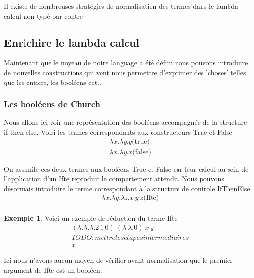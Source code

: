 \documentclass {article}
\theoremstyle{definition}
\newtheorem{example}{Exemple}
\theoremstyle{remark}
\begin{document}
Il existe de nombreuses stratégies de normalisation des termes dans le lambda 
calcul non typé %
par contre



\subsection{Enrichire le lambda calcul}

Maintenant que le noyeau de notre language a été défini nous pouvons introduire
de nouvelles constructions qui vont nous permettre d'exprimer des 'choses' %
telles que les entiers, les booléens ect...

\subsubsection{Les booléens de Church}

Nous allons ici voir une représentation des booléens accompagnée de la 
structure if then else.
Voici les termes correspondants aux constructeurs True et False
\begin{align*}
  &\lambda x.\lambda y. y \mbox{(true)} \\
  &\lambda x.\lambda y. x \mbox{(false)} 
\end{align*}

On assimile ces deux termes aux booléens True et False car leur calcul au sein
de l'application d'un Ifte reproduit le comportement attendu.
Nous pouvons désormais introduire le terme correspondant à la structure de 
controle IfThenElse 
\begin{align*}
  &\lambda x.\lambda y.\lambda z. x\: y\: z \mbox{(Ifte)} \\
\end{align*}

\begin{example}
  Voici un exemple de réduction du terme Ifte
  \begin{align*}
    &(\lambda .\lambda .\lambda . 2\: 1\: 0) \: (\lambda . \lambda . 0) \: x \: y  \\
    & TODO:mettre les etapes intermediaires \\
    & x 
  \end{align*}
\end{example}

Ici nous n'avons aucun moyen de vérifier avant normalisation que le premier
argument de Ifte est un booléen. %
\end{document}
